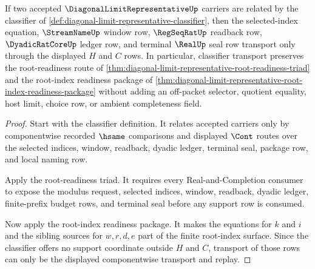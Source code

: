 \begin{theorem}
\label{thm:diagonal-limit-representative-classifier-transport}
If two accepted $\DiagonalLimitRepresentativeUp$ carriers are related by the classifier of \autoref{def:diagonal-limit-representative-classifier}, then the selected-index equation, $\StreamNameUp$ window row, $\RegSeqRatUp$ readback row, $\DyadicRatCoreUp$ ledger row, and terminal $\RealUp$ seal row transport only through the displayed $H$ and $C$ rows. In particular, classifier transport preserves the root-readiness route of \autoref{thm:diagonal-limit-representative-root-readiness-triad} and the root-index readiness package of \autoref{thm:diagonal-limit-representative-root-index-readiness-package} without adding an off-packet selector, quotient equality, host limit, choice row, or ambient completeness field.
\end{theorem}
\begin{proof}
Start with the classifier definition. It relates accepted carriers only by componentwise recorded $\hsame$ comparisons and displayed $\Cont$ routes over the selected indices, window, readback, dyadic ledger, terminal seal, package row, and local naming row.

Apply the root-readiness triad. It requires every Real-and-Completion consumer to expose the modulus request, selected indices, window, readback, dyadic ledger, finite-prefix budget rows, and terminal seal before any support row is consumed.

Now apply the root-index readiness package. It makes the equations for $k$ and $i$ and the sibling sources for $w,r,d,e$ part of the finite root-index surface. Since the classifier offers no support coordinate outside $H$ and $C$, transport of those rows can only be the displayed componentwise transport and replay.
\end{proof}

